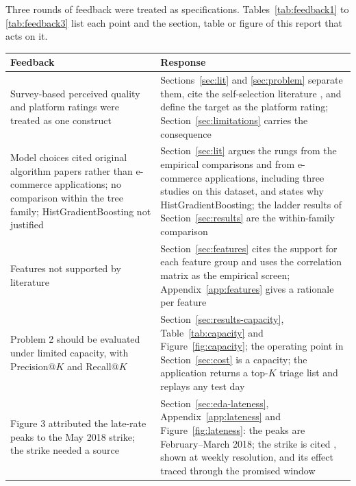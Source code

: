 Three rounds of feedback were treated as specifications.
Tables~\ref{tab:feedback1} to \ref{tab:feedback3} list each point and the
section, table or figure of this report that acts on it.

\begin{center}
\begin{minipage}{\linewidth}
\centering
{}
\label{tab:feedback1}
\small
\begin{tabular}{@{}p{4.4cm}p{10.1cm}@{}}
\toprule
\textbf{Feedback} & \textbf{Response} \\
\midrule
Survey-based perceived quality and platform ratings were treated as one construct &
Sections~\ref{sec:lit} and \ref{sec:problem} separate them, cite the
self-selection literature \citep{hu2009jshaped, hu2017selfselection,
dellarocas2003digitization}, and define the target as the platform rating;
Section~\ref{sec:limitations} carries the consequence \\[2pt]
Model choices cited original algorithm papers rather than e-commerce
applications; no comparison within the tree family; HistGradientBoosting not
justified &
Section~\ref{sec:lit} argues the rungs from the empirical comparisons and from
e-commerce applications, including three studies on this dataset, and states
why HistGradientBoosting; the ladder results of Section~\ref{sec:results} are
the within-family comparison \\[2pt]
Features not supported by literature &
Section~\ref{sec:features} cites the support for each feature group and uses
the correlation matrix as the empirical screen; Appendix~\ref{app:features}
gives a rationale per feature \\[2pt]
Problem 2 should be evaluated under limited capacity, with Precision@$K$ and
Recall@$K$ &
Section~\ref{sec:results-capacity}, Table~\ref{tab:capacity} and
Figure~\ref{fig:capacity}; the operating point in Section~\ref{sec:cost} is a
capacity; the application returns a top-$K$ triage list and replays any test
day \\[2pt]
Figure 3 attributed the late-rate peaks to the May 2018 strike; the strike
needed a source &
Section~\ref{sec:eda-lateness}, Appendix~\ref{app:lateness} and
Figure~\ref{fig:lateness}: the peaks are February--March 2018; the strike is
cited \citep{bloomberg2018strike, tecnoblog2018correios}, shown at weekly
resolution, and its effect traced through the promised window \\[2pt]

\end{tabular}
\end{minipage}
\end{center}
